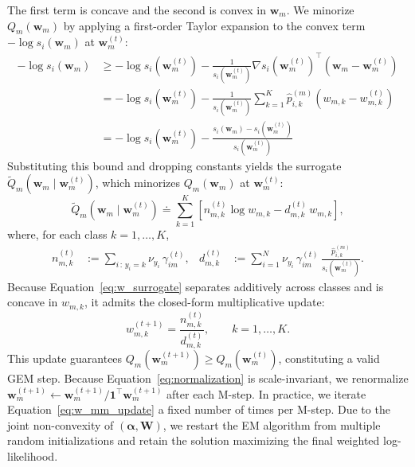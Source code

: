 \documentclass[11pt]{elsarticle}
\begin{document}
The first term is concave and the second is convex in $\bm{w}_m$. We minorize $Q_m(\bm{w}_m)$ by applying a first-order Taylor expansion to the convex term $-\log s_i(\bm{w}_m)$ at $\bm{w}_m^{(t)}$:
\begin{align}
-\log s_i(\bm{w}_m) &\geq -\log s_i(\bm{w}_m^{(t)}) - \frac{1}{s_i(\bm{w}_m^{(t)})} \nabla s_i(\bm{w}_m^{(t)})^\intercal (\bm{w}_m - \bm{w}_m^{(t)}) \\
&= -\log s_i(\bm{w}_m^{(t)}) - \frac{1}{s_i(\bm{w}_m^{(t)})} \sum_{k=1}^K \hat{p}^{(m)}_{i,k} (w_{m,k} - w_{m,k}^{(t)}) \\
&= -\log s_i(\bm{w}_m^{(t)}) - \frac{s_i(\bm{w}_m)-s_i(\bm{w}_m^{(t)})}{s_i(\bm{w}_m^{(t)})}
\end{align}
Substituting this bound and dropping constants yields the surrogate $\widetilde{Q}_m(\bm{w}_m \mid \bm{w}_m^{(t)})$, which minorizes $Q_m(\bm{w}_m)$ at $\bm{w}_m^{(t)}$:
\begin{equation}
\label{eq:w_surrogate}
\widetilde{Q}_m(\bm{w}_m \mid \bm{w}_m^{(t)}) \doteq \sum_{k=1}^K \left[ n_{m,k}^{(t)} \log w_{m,k} - d_{m,k}^{(t)} \, w_{m,k} \right],
\end{equation}
where, for each class $k = 1, \ldots, K$,
\begin{align}
n_{m,k}^{(t)} &:= \sum_{i \,:\, y_i = k} \nu_{y_i} \, \gamma_{im}^{(t)}, &
d_{m,k}^{(t)} &:= \sum_{i=1}^N \nu_{y_i} \, \gamma_{im}^{(t)} \, \frac{\hat{p}^{(m)}_{i,k}}{s_i(\bm{w}_m^{(t)})}.
\end{align}
Because Equation~\eqref{eq:w_surrogate} separates additively across classes and is concave in $w_{m,k}$, it admits the closed-form multiplicative update:
\begin{equation}
\label{eq:w_mm_update}
w_{m,k}^{(t+1)} = \frac{n_{m,k}^{(t)}}{d_{m,k}^{(t)}}, \qquad k = 1, \ldots, K.
\end{equation}
This update guarantees $Q_m(\bm{w}_m^{(t+1)}) \geq Q_m(\bm{w}_m^{(t)})$, constituting a valid GEM step. Because Equation~\eqref{eq:normalization} is scale-invariant, we renormalize $\bm{w}_m^{(t+1)} \leftarrow \bm{w}_m^{(t+1)} / \bm{1}^\intercal \bm{w}_m^{(t+1)}$ after each M-step. In practice, we iterate Equation~\eqref{eq:w_mm_update} a fixed number of times per M-step. Due to the joint non-convexity of $(\bm{\alpha}, \bm{W})$, we restart the EM algorithm from multiple random initializations and retain the solution maximizing the final weighted log-likelihood.
\newpage

\medskip


\end{document}

